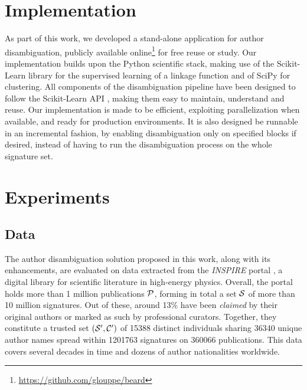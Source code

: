 \documentclass{article}
\begin{document}

\section{Implementation}
\label{implementation}

As part of this work, we developed a stand-alone application for author
disambiguation, publicly available online\footnote{\url{https://github.com/glouppe/beard}} for free reuse
or study.
Our implementation builds upon the Python scientific stack, making
use of the Scikit-Learn library \citep{scikitlearn} for the supervised learning
of a linkage function and of SciPy \citep{scipy} for clustering.
All components of the disambiguation pipeline have been designed to follow the
Scikit-Learn API \citep{scikitlearnAPI}, making them easy to maintain,
understand and reuse.
Our implementation is made to be efficient, exploiting parallelization when available, and ready for production environments.
It is also designed be runnable
in an incremental fashion, by enabling disambiguation only on specified blocks if desired,
instead of having to run the disambiguation process on the whole signature set.



\section{Experiments}
\label{experiments}

\subsection{Data}

The author disambiguation solution proposed in this work, along with its
enhancements, are evaluated on data extracted from the \emph{INSPIRE} portal
\citep{gentil2009information}, a digital library for scientific literature in
high-energy physics.
Overall, the portal holds more than 1 million publications ${\cal P}$,
forming in total a set ${\cal S}$ of more than 10 million signatures.
Out of these, around 13\% have been \textit{claimed} by their
original authors or marked as such by professional curators.
Together, they constitute a trusted set $({\cal S}^\prime, {\cal C}^\prime)$ of 15388 distinct individuals sharing
36340 unique author names spread within 1201763 signatures on 360066
publications. This data covers several decades in time and dozens of author
nationalities worldwide.
\end{document}
